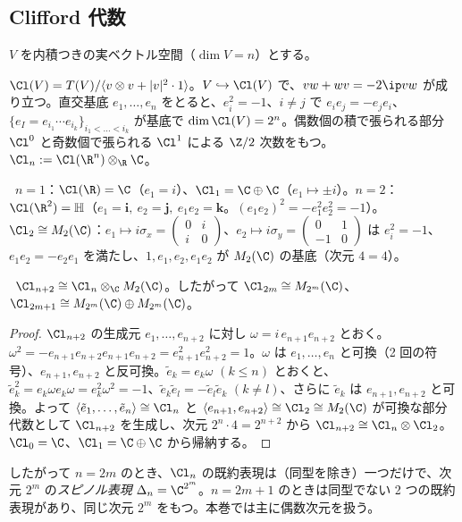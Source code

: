 \subsection{Clifford 代数}
$V$ を内積つきの実ベクトル空間（$\dim V=n$）とする。
\begin{defn}[Clifford 代数]\label{def:Cl}
$\Cl(V)=T(V)/\langle v\otimes v+|v|^2\cdot1\rangle$。$V\hookrightarrow\Cl(V)$ で、$vw+wv=-2\ip vw$ が成り立つ。直交基底 $e_1,\dots,e_n$ をとると、$e_i^2=-1$、$i\ne j$ で $e_ie_j=-e_je_i$、$\{e_I=e_{i_1}\cdots e_{i_k}\}_{i_1<\dots<i_k}$ が基底で $\dim\Cl(V)=2^n$。偶数個の積で張られる部分 $\Cl^0$ と奇数個で張られる $\Cl^1$ による $\Z/2$ 次数をもつ。$\Cl_n:=\Cl(\R^n)\otimes_{\R}\C$。
\end{defn}
\begin{ex}\label{ex:Cl12}\tP\
$n=1$：$\Cl(\R)=\C$（$e_1=i$）、$\Cl_1=\C\oplus\C$（$e_1\mapsto\pm i$）。$n=2$：$\Cl(\R^2)=\mathbb H$（$e_1=\mathbf i,\ e_2=\mathbf j,\ e_1e_2=\mathbf k$。$(e_1e_2)^2=-e_1^2e_2^2=-1$）。$\Cl_2\cong M_2(\C)$：$e_1\mapsto i\sigma_x=\begin{pmatrix}0&i\\i&0\end{pmatrix}$、$e_2\mapsto i\sigma_y=\begin{pmatrix}0&1\\-1&0\end{pmatrix}$ は $e_i^2=-1$、$e_1e_2=-e_2e_1$ を満たし、$1,e_1,e_2,e_1e_2$ が $M_2(\C)$ の基底（次元 $4=4$）。
\end{ex}
\begin{prop}[複素 Clifford 代数の構造]\label{prop:Clstruct}\tP\
$\Cl_{n+2}\cong\Cl_n\otimes_{\C}M_2(\C)$。したがって $\Cl_{2m}\cong M_{2^m}(\C)$、$\Cl_{2m+1}\cong M_{2^m}(\C)\oplus M_{2^m}(\C)$。
\end{prop}
\begin{proof}
$\Cl_{n+2}$ の生成元 $e_1,\dots,e_{n+2}$ に対し $\omega=i\,e_{n+1}e_{n+2}$ とおく。$\omega^2=-e_{n+1}e_{n+2}e_{n+1}e_{n+2}=e_{n+1}^2e_{n+2}^2=1$。$\omega$ は $e_1,\dots,e_n$ と可換（2 回の符号）、$e_{n+1},e_{n+2}$ と反可換。$\tilde e_k=e_k\omega$ $(k\le n)$ とおくと、$\tilde e_k^2=e_k\omega e_k\omega=e_k^2\omega^2=-1$、$\tilde e_k\tilde e_l=-\tilde e_l\tilde e_k$ $(k\ne l)$、さらに $\tilde e_k$ は $e_{n+1},e_{n+2}$ と可換。よって $\langle\tilde e_1,\dots,\tilde e_n\rangle\cong\Cl_n$ と $\langle e_{n+1},e_{n+2}\rangle\cong\Cl_2\cong M_2(\C)$ が可換な部分代数として $\Cl_{n+2}$ を生成し、次元 $2^n\cdot4=2^{n+2}$ から $\Cl_{n+2}\cong\Cl_n\otimes\Cl_2$。$\Cl_0=\C$、$\Cl_1=\C\oplus\C$ から帰納する。
\end{proof}
したがって $n=2m$ のとき、$\Cl_n$ の既約表現は（同型を除き）一つだけで、次元 $2^m$ の\emph{スピノル表現} $\Delta_n=\C^{2^m}$。$n=2m+1$ のときは同型でない 2 つの既約表現があり、同じ次元 $2^m$ をもつ。本巻では主に偶数次元を扱う。

